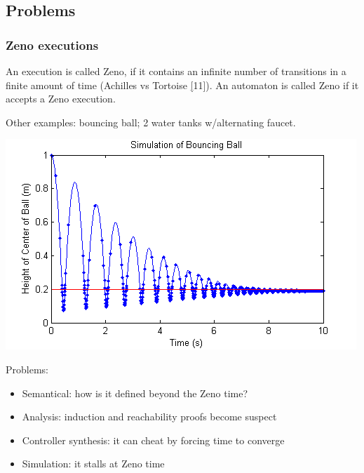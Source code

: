 \documentclass{beamer}
\begin{document}


\subsection{Problems}

\begin{frame}
\frametitle{Zeno executions}

An execution is called Zeno, if it contains an infinite number of transitions in a finite
amount of time (Achilles vs Tortoise \href{https://en.wikipedia.org/wiki/Zeno's_paradoxes}[11]). An automaton is called Zeno if it accepts a Zeno execution. \newline

Other examples: bouncing ball; 2 water tanks w/alternating faucet.

\includegraphics[scale=0.3]{bouncing_ball.png}


Problems: 
\begin{itemize}
	\item Semantical: how is it defined beyond the Zeno time?
	\item Analysis: induction and reachability proofs become suspect
	\item Controller synthesis: it can cheat by forcing time to converge
	\item Simulation: it stalls at Zeno time
\end{itemize}

\end{frame}




\end{document}
